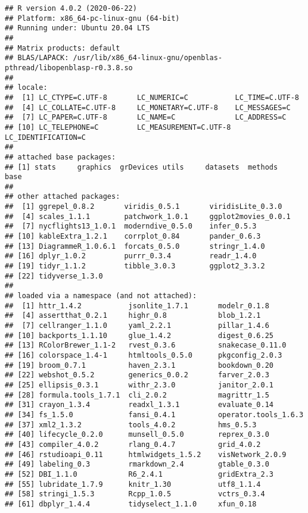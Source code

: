 \documentclass[
]{book}
\begin{document}
\begin{verbatim}
## R version 4.0.2 (2020-06-22)
## Platform: x86_64-pc-linux-gnu (64-bit)
## Running under: Ubuntu 20.04 LTS
## 
## Matrix products: default
## BLAS/LAPACK: /usr/lib/x86_64-linux-gnu/openblas-pthread/libopenblasp-r0.3.8.so
## 
## locale:
##  [1] LC_CTYPE=C.UTF-8       LC_NUMERIC=C           LC_TIME=C.UTF-8       
##  [4] LC_COLLATE=C.UTF-8     LC_MONETARY=C.UTF-8    LC_MESSAGES=C         
##  [7] LC_PAPER=C.UTF-8       LC_NAME=C              LC_ADDRESS=C          
## [10] LC_TELEPHONE=C         LC_MEASUREMENT=C.UTF-8 LC_IDENTIFICATION=C   
## 
## attached base packages:
## [1] stats     graphics  grDevices utils     datasets  methods   base     
## 
## other attached packages:
##  [1] ggrepel_0.8.2       viridis_0.5.1       viridisLite_0.3.0  
##  [4] scales_1.1.1        patchwork_1.0.1     ggplot2movies_0.0.1
##  [7] nycflights13_1.0.1  moderndive_0.5.0    infer_0.5.3        
## [10] kableExtra_1.2.1    corrplot_0.84       pander_0.6.3       
## [13] DiagrammeR_1.0.6.1  forcats_0.5.0       stringr_1.4.0      
## [16] dplyr_1.0.2         purrr_0.3.4         readr_1.4.0        
## [19] tidyr_1.1.2         tibble_3.0.3        ggplot2_3.3.2      
## [22] tidyverse_1.3.0    
## 
## loaded via a namespace (and not attached):
##  [1] httr_1.4.2           jsonlite_1.7.1       modelr_0.1.8        
##  [4] assertthat_0.2.1     highr_0.8            blob_1.2.1          
##  [7] cellranger_1.1.0     yaml_2.2.1           pillar_1.4.6        
## [10] backports_1.1.10     glue_1.4.2           digest_0.6.25       
## [13] RColorBrewer_1.1-2   rvest_0.3.6          snakecase_0.11.0    
## [16] colorspace_1.4-1     htmltools_0.5.0      pkgconfig_2.0.3     
## [19] broom_0.7.1          haven_2.3.1          bookdown_0.20       
## [22] webshot_0.5.2        generics_0.0.2       farver_2.0.3        
## [25] ellipsis_0.3.1       withr_2.3.0          janitor_2.0.1       
## [28] formula.tools_1.7.1  cli_2.0.2            magrittr_1.5        
## [31] crayon_1.3.4         readxl_1.3.1         evaluate_0.14       
## [34] fs_1.5.0             fansi_0.4.1          operator.tools_1.6.3
## [37] xml2_1.3.2           tools_4.0.2          hms_0.5.3           
## [40] lifecycle_0.2.0      munsell_0.5.0        reprex_0.3.0        
## [43] compiler_4.0.2       rlang_0.4.7          grid_4.0.2          
## [46] rstudioapi_0.11      htmlwidgets_1.5.2    visNetwork_2.0.9    
## [49] labeling_0.3         rmarkdown_2.4        gtable_0.3.0        
## [52] DBI_1.1.0            R6_2.4.1             gridExtra_2.3       
## [55] lubridate_1.7.9      knitr_1.30           utf8_1.1.4          
## [58] stringi_1.5.3        Rcpp_1.0.5           vctrs_0.3.4         
## [61] dbplyr_1.4.4         tidyselect_1.1.0     xfun_0.18
\end{verbatim}
\end{document}

